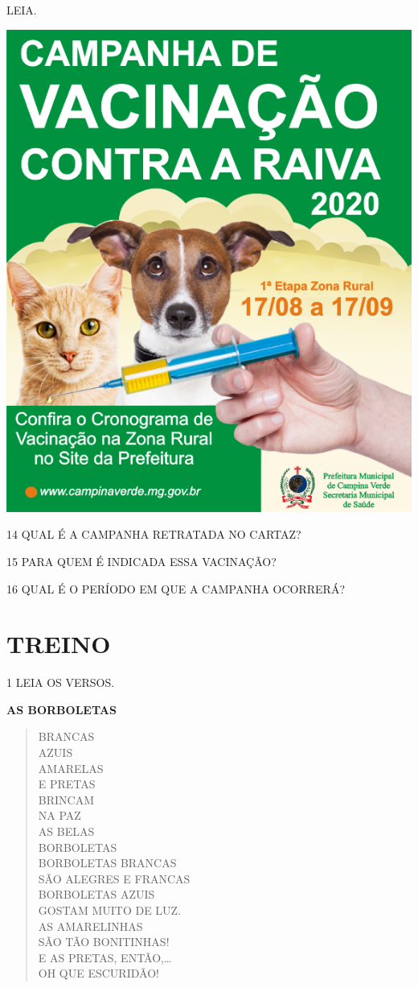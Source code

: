 
LEIA.

\begin{center}
\includegraphics[width=.5\textwidth]{media/image131.png}
\end{center}

\num{14} QUAL É A CAMPANHA RETRATADA NO CARTAZ?


\num{15} PARA QUEM É INDICADA ESSA VACINAÇÃO?


\num{16} QUAL É O PERÍODO EM QUE A CAMPANHA OCORRERÁ?


\pagebreak
\section{TREINO}


\num{1} LEIA OS VERSOS.

\textbf{AS BORBOLETAS}

\begin{verse}
BRANCAS\\
AZUIS\\
AMARELAS\\
E PRETAS\\
BRINCAM\\
NA PAZ\\
AS BELAS\\
BORBOLETAS\\
BORBOLETAS BRANCAS\\
SÃO ALEGRES E FRANCAS\\
BORBOLETAS AZUIS\\
GOSTAM MUITO DE LUZ.\\
AS AMARELINHAS\\
SÃO TÃO BONITINHAS!\\
E AS PRETAS, ENTÃO,\ldots{}\\
OH QUE ESCURIDÃO!
\end{verse}

